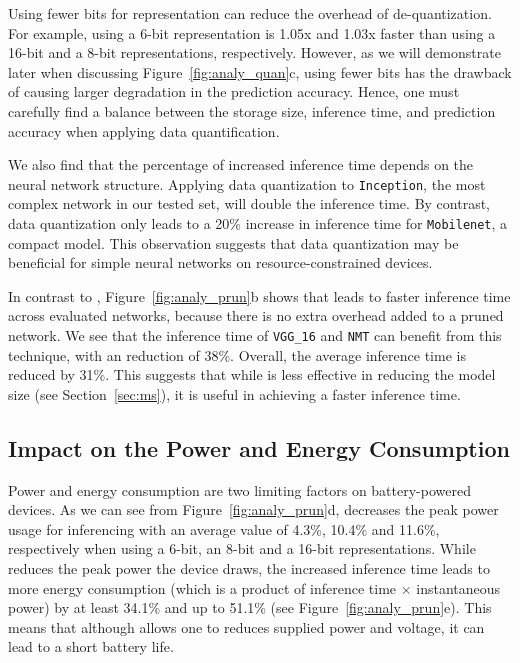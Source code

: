 Using fewer bits for representation can reduce the overhead of de-quantization. For example, using a 6-bit representation is 1.05x and
1.03x faster than using a 16-bit and a 8-bit representations, respectively. However, as we will demonstrate later when discussing
Figure~\ref{fig:analy_quan}c, using fewer bits has the drawback of causing larger degradation in the prediction accuracy. Hence, one must
carefully find a balance between the storage size, inference time, and prediction accuracy when applying data quantification.

We also find that the percentage of increased inference time depends on the neural network structure. Applying data quantization to
\texttt{Inception}, the most complex network in our \CNN tested set, will double the inference time. By contrast, data quantization only
leads to a 20\% increase in inference time for \texttt{Mobilenet}, a compact model. This observation suggests that data quantization may be
beneficial for simple neural networks on resource-constrained devices.


In contrast to \quantization, Figure~\ref{fig:analy_prun}b shows that \pruning leads to faster inference time across evaluated networks,
because there is no extra overhead added to a pruned network. We see that the inference time of \texttt{VGG\_16} and \texttt{NMT} can
benefit from this technique, with an reduction of 38\%. Overall, the average inference time is reduced by 31\%. This suggests that while
\pruning is less effective in reducing the model size (see Section~\ref{sec:ms}), it is useful in achieving a faster inference time.

\subsection{Impact on the Power and Energy Consumption}
Power and energy consumption are two limiting factors on battery-powered devices. As we can see from Figure~\ref{fig:analy_prun}d,
\quantization decreases the peak power usage for inferencing with an average value of 4.3\%, 10.4\% and 11.6\%, respectively when using a
6-bit, an 8-bit and a 16-bit representations. While \quantization reduces the peak power the device draws, the increased inference time
leads to more energy consumption (which is a product of inference time $\times$ instantaneous power) by at least 34.1\% and up to 51.1\%
(see Figure~\ref{fig:analy_prun}e). This means that although \quantization allows one to reduces supplied power and voltage, it can lead to
a short battery life.

